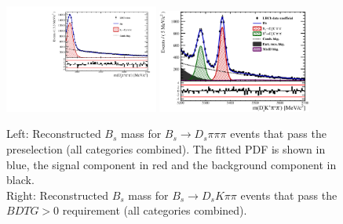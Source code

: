 \begin{figure}[h]
\centering
\includegraphics[height=!,width=0.45\textwidth]{figs/MassFit/norm_preselected_pull.pdf}
\includegraphics[height=!,width=0.45\textwidth]{figs/MassFit/signal_pull_00.eps}
\caption{Left: Reconstructed $B_s$ mass for $B_s\to D_s\pi\pi\pi$ events that pass the preselection (all categories combined). The fitted
PDF is shown in blue, the signal component in red and the background component in black.
\\Right: Reconstructed $B_s$ mass for $B_s\to D_sK\pi\pi$ events that pass the $BDTG > 0$ requirement (all categories combined). }
\label{fig:massFit_preselected}
\end{figure}
